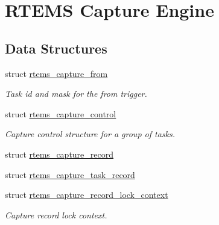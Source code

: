 \hypertarget{group__libmisc__capture}{}\section{R\+T\+E\+MS Capture Engine}
\label{group__libmisc__capture}
\subsection*{Data Structures}
\begin{DoxyCompactItemize}
\item 
struct \mbox{\hyperlink{structrtems__capture__from}{rtems\+\_\+capture\+\_\+from}}
\begin{DoxyCompactList}\small\item\em Task id and mask for the from trigger. \end{DoxyCompactList}\item 
struct \mbox{\hyperlink{structrtems__capture__control}{rtems\+\_\+capture\+\_\+control}}
\begin{DoxyCompactList}\small\item\em Capture control structure for a group of tasks. \end{DoxyCompactList}\item 
struct \mbox{\hyperlink{structrtems__capture__record}{rtems\+\_\+capture\+\_\+record}}
\item 
struct \mbox{\hyperlink{structrtems__capture__task__record}{rtems\+\_\+capture\+\_\+task\+\_\+record}}
\item 
struct \mbox{\hyperlink{structrtems__capture__record__lock__context}{rtems\+\_\+capture\+\_\+record\+\_\+lock\+\_\+context}}
\begin{DoxyCompactList}\small\item\em Capture record lock context. \end{DoxyCompactList}\end{DoxyCompactItemize}
